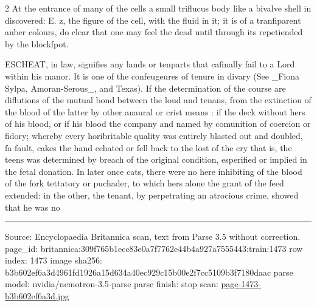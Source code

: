 \documentclass[10pt]{article}
\begin{document}
\begin{multicols}{2}
At the entrance of many of the cells a small triflucus body like a bivalve shell in discovered: E. z, the figure of the cell, with the fluid in it; it is of a tranfiparent anber colours, do clear that one may feel the dead until through its repetiended by the blockfpot.

ESCHEAT, in law, signifies any lands or tenparts that cafinally fail to a Lord within his manor. It is one of the confeugeures of tenure in divary (See \_Fiona Sylpa, Amoran-Serous\_, and Texas). If the determination of the course are diflutions of the mutual bond between the loud and tenans, from the extinction of the blood of the latter by other anaural or crist means : if the deck without hers of his blood, or if his blood the company and named by comunition of coercion or fidory; whereby every horibritable quality was entirely blasted out and doubled, fa fault, cakes the hand echated or fell back to the lost of the cry that is, the teens was determined by breach of the original condition, esperified or implied in the fetal donation. In later once cats, there were no here inhibiting of the blood of the fork tettatory or puchader, to which hers alone the grant of the feed extended: in the other, the tenant, by perpetrating an atrocious crime, showed that he was no

\end{multicols}
\vfill\par\noindent\rule{\linewidth}{0.4pt}\par
{\scriptsize\color{gray}\noindent Source: Encyclopaedia Britannica scan, text from Parse 3.5 without correction. page\_id: britannica:309f765b1ecc83e0a7f7762e44b4a927a7555443:train:1473 \quad row index: 1473 \quad image sha256: b3b602ef6a3d4961fd1926a15d634a40ec929c15b00e2f7cc5109b3f7180daac \quad parse model: nvidia/nemotron-3.5-parse \quad parse finish: stop \quad scan: \href{../scans/page-1473-b3b602ef6a3d.jpg}{page-1473-b3b602ef6a3d.jpg}\par}
\end{document}
